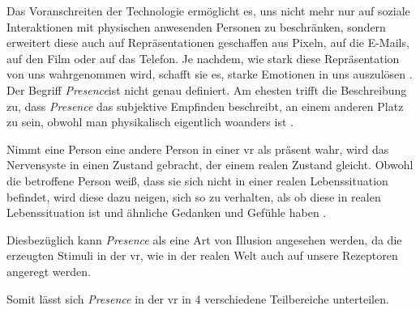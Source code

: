 \documentclass[a4paper,11pt]{article}%
\renewcommand{\\}{\vspace*{0.5\baselineskip} \newline}
\begin{document}
	Das Voranschreiten der Technologie ermöglicht es, uns nicht mehr nur auf soziale Interaktionen mit physischen anwesenden Personen zu beschränken, sondern erweitert diese auch auf Repräsentationen geschaffen aus Pixeln, auf die E-Mails, auf den Film oder auf das Telefon. Je nachdem, wie stark diese Repräsentation von uns wahrgenommen wird, schafft sie es, starke Emotionen in uns auszulösen \citep[p. 4-6]{biocca2002defining}.
%	
Der Begriff  \textit{Presence}ist nicht genau definiert. Am ehesten trifft die Beschreibung zu, dass  \textit{Presence} das subjektive Empfinden beschreibt, an einem anderen Platz zu sein, obwohl man physikalisch eigentlich woanders ist \citep[p. 1]{witmer1998measuring}.

	Nimmt eine Person eine andere Person in einer \ac{vr} als präsent wahr, wird das Nervensyste in einen Zustand gebracht, der einem realen Zustand gleicht. Obwohl die betroffene Person weiß, dass sie sich nicht in einer realen Lebenssituation befindet, wird diese dazu neigen, sich so zu verhalten, als ob diese in realen Lebenssituation ist und ähnliche Gedanken und Gefühle haben \citep{slater2003note}.

Diesbezüglich kann \textit{Presence} als eine Art von Illusion angesehen werden, da die erzeugten Stimuli in der \ac{vr}, wie in der realen Welt auch auf unsere Rezeptoren angeregt werden.

Somit lässt sich \textit{Presence} in der \ac{vr} in 4 verschiedene Teilbereiche unterteilen.
\end{document}
